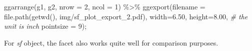 \documentclass[
  11pt,
]{book}
\newenvironment{Shaded}{\begin{snugshade}}{\end{snugshade}}
\newcommand{\AttributeTok}[1]{\textcolor[rgb]{0.77,0.63,0.00}{#1}}
\newcommand{\CommentTok}[1]{\textcolor[rgb]{0.56,0.35,0.01}{\textit{#1}}}
\newcommand{\DecValTok}[1]{\textcolor[rgb]{0.00,0.00,0.81}{#1}}
\newcommand{\FloatTok}[1]{\textcolor[rgb]{0.00,0.00,0.81}{#1}}
\newcommand{\FunctionTok}[1]{\textcolor[rgb]{0.00,0.00,0.00}{#1}}
\newcommand{\NormalTok}[1]{#1}
\newcommand{\SpecialCharTok}[1]{\textcolor[rgb]{0.00,0.00,0.00}{#1}}
\newcommand{\StringTok}[1]{\textcolor[rgb]{0.31,0.60,0.02}{#1}}
\begin{document}
\begin{Shaded}
\begin{Highlighting}[]
\FunctionTok{ggarrange}\NormalTok{(g1, g2, }\AttributeTok{nrow =} \DecValTok{2}\NormalTok{, }\AttributeTok{ncol =} \DecValTok{1}\NormalTok{) }\SpecialCharTok{\%\textgreater{}\%}
  \FunctionTok{ggexport}\NormalTok{(}\AttributeTok{filename =} \FunctionTok{file.path}\NormalTok{(}\FunctionTok{getwd}\NormalTok{(), }\StringTok{\textquotesingle{}img/sf\_plot\_export\_2.pdf\textquotesingle{}}\NormalTok{),}
           \AttributeTok{width=}\FloatTok{6.50}\NormalTok{, }\AttributeTok{height=}\FloatTok{8.00}\NormalTok{, }\CommentTok{\# the unit is inch}
           \AttributeTok{pointsize =} \DecValTok{9}\NormalTok{); }
\end{Highlighting}
\end{Shaded}

For \emph{sf} object, the facet also works quite well for comparison purposes.
\end{document}
